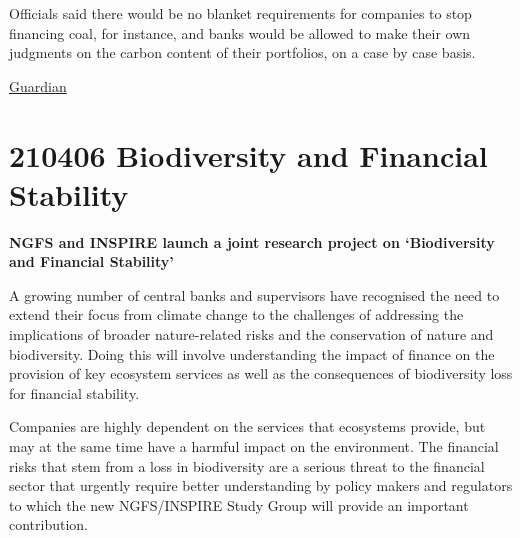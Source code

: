\documentclass[
]{book}
\begin{document}
Officials said there would be no blanket requirements for companies to stop financing coal, for instance, and banks would be allowed to make their own judgments on the carbon content of their portfolios, on a case by case basis.

\href{https://www.theguardian.com/business/2021/apr/21/leading-finance-firms-sign-up-to-mark-carney-forum-on-low-carbon-investment}{Guardian}

\hypertarget{biodiversity-and-financial-stability}{%
\section{210406 Biodiversity and Financial Stability}\label{biodiversity-and-financial-stability}}

\textbf{NGFS and INSPIRE launch a joint research project on `Biodiversity and Financial Stability'}

A growing number of central banks and supervisors have recognised the need to extend their focus from climate change to the challenges of addressing the implications of broader nature-related risks and the conservation of nature and biodiversity. Doing this will involve understanding the impact of finance on the provision of key ecosystem services as well as the consequences of biodiversity loss for financial stability.

Companies are highly dependent on the services that ecosystems provide, but may at the same time have a harmful impact on the environment. The financial risks that stem from a loss in biodiversity are a serious threat to the financial sector that urgently require better understanding by policy makers and regulators to which the new NGFS/INSPIRE Study Group will provide an important contribution.

  
\end{document}
